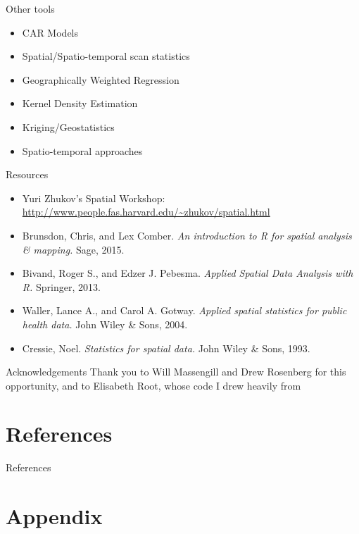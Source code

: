 \documentclass[aspectratio = 169, 12pt]{beamer}\usepackage[]{graphicx}\usepackage[]{color}
\begin{document}
\begin{frame}{Other tools}
\begin{itemize}
\item CAR Models
\item Spatial/Spatio-temporal scan statistics
\item Geographically Weighted Regression
\item Kernel Density Estimation
\item Kriging/Geostatistics
\item Spatio-temporal approaches
\end{itemize}
\end{frame}

\begin{frame}{Resources}
\begin{itemize}
\item Yuri Zhukov's Spatial Workshop: \url{http://www.people.fas.harvard.edu/~zhukov/spatial.html}
\item Brunsdon, Chris, and Lex Comber. \textit{An introduction to R for spatial analysis \& mapping.} Sage, 2015.
\item Bivand, Roger S., and Edzer J. Pebesma. \textit{Applied Spatial Data Analysis with R.} Springer, 2013.
\item Waller, Lance A., and Carol A. Gotway. \textit{Applied spatial statistics for public health data.} John Wiley \& Sons, 2004.
\item Cressie, Noel. \textit{Statistics for spatial data.} John Wiley \& Sons, 1993.
\end{itemize}
\end{frame}

\begin{frame}{Acknowledgements}
Thank you to Will Massengill and Drew Rosenberg for this opportunity, and to Elisabeth Root, whose code I drew heavily from
\end{frame}


\section*{References}     %

\begin{frame}{References}

\end{frame}

\section*{Appendix}     %
\subsection*{}

\begin{frame}{}
\end{frame}
\end{document}
